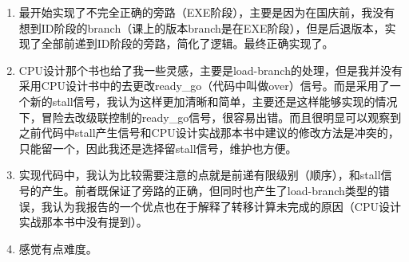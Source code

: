\documentclass[a4paper]{article}
\begin{document}
\begin{enumerate}
    \item 最开始实现了不完全正确的旁路（EXE阶段），主要是因为在国庆前，我没有想到ID阶段的branch（课上的版本branch是在EXE阶段），但是后退版本，实现了全部前递到ID阶段的旁路，简化了逻辑。最终正确实现了。
    \item CPU设计那个书也给了我一些灵感，主要是load-branch的处理，但是我并没有采用CPU设计书中的去更改ready\_go（代码中叫做over）信号。而是采用了一个新的stall信号，我认为这样更加清晰和简单，主要还是这样能够实现的情况下，冒险去改级联控制的ready\_go信号，很容易出错。而且很明显可以观察到之前代码中stall产生信号和CPU设计实战那本书中建议的修改方法是冲突的，只能留一个，因此我还是选择留stall信号，维护也方便。
    \item 实现代码中，我认为比较需要注意的点就是前递有限级别（顺序），和stall信号的产生。前者既保证了旁路的正确，但同时也产生了load-branch类型的错误，我认为我报告的一个优点也在于解释了转移计算未完成的原因（CPU设计实战那本书中没有提到）。
    \item 感觉有点难度。
\end{enumerate}
    

\label{LastPage}
\end{document}
